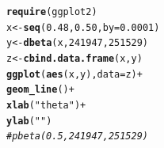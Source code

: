 \documentclass[12pt]{article}\usepackage[]{graphicx}\usepackage[]{color}
\makeatletter
\newcommand{\hlnum}[1]{\textcolor[rgb]{0.686,0.059,0.569}{#1}}%
\newcommand{\hlstr}[1]{\textcolor[rgb]{0.192,0.494,0.8}{#1}}%
\newcommand{\hlcom}[1]{\textcolor[rgb]{0.678,0.584,0.686}{\textit{#1}}}%
\newcommand{\hlopt}[1]{\textcolor[rgb]{0,0,0}{#1}}%
\newcommand{\hlstd}[1]{\textcolor[rgb]{0.345,0.345,0.345}{#1}}%
\newcommand{\hlkwb}[1]{\textcolor[rgb]{0.69,0.353,0.396}{#1}}%
\newcommand{\hlkwc}[1]{\textcolor[rgb]{0.333,0.667,0.333}{#1}}%
\newcommand{\hlkwd}[1]{\textcolor[rgb]{0.737,0.353,0.396}{\textbf{#1}}}%
\newenvironment{kframe}{%
 \def\at@end@of@kframe{}%
 \ifinner\ifhmode%
  \def\at@end@of@kframe{\end{minipage}}%
  \begin{minipage}{\columnwidth}%
 \fi\fi%
 \def\FrameCommand##1{\hskip\@totalleftmargin \hskip-\fboxsep
 \colorbox{shadecolor}{##1}\hskip-\fboxsep
     \hskip-\linewidth \hskip-\@totalleftmargin \hskip\columnwidth}%
 \MakeFramed {\advance\hsize-\width
   \@totalleftmargin\z@ \linewidth\hsize
   \@setminipage}}%
 {\par\unskip\endMakeFramed%
 \at@end@of@kframe}
\newenvironment{knitrout}{}{} %
\makeatother
\begin{document}
\begin{knitrout}\footnotesize
{}\color{fgcolor}\begin{kframe}
\begin{alltt}
\hlkwd{require}\hlstd{(ggplot2)}
\hlstd{x} \hlkwb{<-} \hlkwd{seq}\hlstd{(}\hlnum{0.48}\hlstd{,}\hlnum{0.50}\hlstd{,} \hlkwc{by}\hlstd{=}\hlnum{0.0001}\hlstd{)}
\hlstd{y} \hlkwb{<-} \hlkwd{dbeta}\hlstd{(x,} \hlnum{241947}\hlstd{,} \hlnum{251529}\hlstd{)}
\hlstd{z} \hlkwb{<-} \hlkwd{cbind.data.frame}\hlstd{(x,y)}
\hlkwd{ggplot}\hlstd{(}\hlkwd{aes}\hlstd{(x, y),} \hlkwc{data}\hlstd{=z)} \hlopt{+}
  \hlkwd{geom_line}\hlstd{()}\hlopt{+}
  \hlkwd{xlab}\hlstd{(}\hlstr{"theta"}\hlstd{)}\hlopt{+}
  \hlkwd{ylab}\hlstd{(}\hlstr{""}\hlstd{)}
\hlcom{#pbeta(0.5, 241947, 251529)}
\end{alltt}
\end{kframe}
\end{knitrout}
\end{document}

